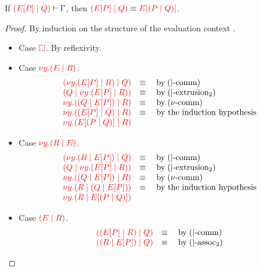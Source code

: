 \begin{lemmaB}\label{thm:nc-display-pool-1}
  If $\seq[{ \ncPool{\cpPlug{E}{P}}{Q} }]{ \Gamma }$, then
  $\tm{\ncPool{\cpPlug{E}{P}}{Q}} \equiv \tm{\cpPlug{E}{\ncPool{P}{Q}}}$. 
\end{lemmaB}
\begin{proof}
  By induction on the structure of the evaluation context .
  \begin{itemize}
  \item
    Case $\tm{\Box}$. By reflexivity.
  \item
    Case $\tm{\cpCut{y}{E}{R}}$.
    \[\!
      \begin{array}{ll}
        \tm{\ncPool{\cpCut{y}{\cpPlug{E}{P}}{R}}{Q}} & \equiv \quad \text{by} \; \ncEquivPoolComm \\
        \tm{\ncPool{Q}{\cpCut{y}{\cpPlug{E}{P}}{R}}} & \equiv \quad \text{by} \; \ncRedKappaPool2 \\
        \tm{\cpCut{y}{\ncPool{Q}{\cpPlug{E}{P}}}{R}} & \equiv \quad \text{by} \; \cpEquivCutComm \\
        \tm{\cpCut{y}{\ncPool{\cpPlug{E}{P}}{Q}}{R}} & \equiv \quad \text{by the induction hypothesis}\\
        \tm{\cpCut{y}{\cpPlug{E}{\ncPool{P}{Q}}}{R}} &
      \end{array}
    \]
  \item
    Case $\tm{\cpCut{y}{R}{E}}$.
    \[\!
      \begin{array}{ll}
        \tm{\ncPool{\cpCut{y}{R}{\cpPlug{E}{P}}}{Q}} & \equiv \quad \text{by} \; \ncEquivPoolComm \\
        \tm{\ncPool{Q}{\cpCut{y}{\cpPlug{E}{P}}{R}}} & \equiv \quad \text{by} \; \ncRedKappaPool2 \\
        \tm{\cpCut{y}{\ncPool{Q}{\cpPlug{E}{P}}}{R}} & \equiv \quad \text{by} \; \cpEquivCutComm \\
        \tm{\cpCut{y}{R}{\ncPool{Q}{\cpPlug{E}{P}}}} & \equiv \quad \text{by the induction hypothesis} \\
        \tm{\cpCut{y}{R}{\cpPlug{E}{\ncPool{P}{Q}}}}
      \end{array}
    \]
  \item
    Case $\tm{\ncPool{E}{R}}$.
    \[\!
      \begin{array}{ll}
        \tm{\ncPool{\ncPool{\cpPlug{E}{P}}{R}}{Q}} & \equiv \quad \text{by} \; \ncEquivPoolComm \\
        \tm{\ncPool{\ncPool{R}{\cpPlug{E}{P}}}{Q}} & \equiv \quad \text{by} \; \ncEquivPoolAss2 \\

\end{array}\]
\end{itemize}
\end{proof}

